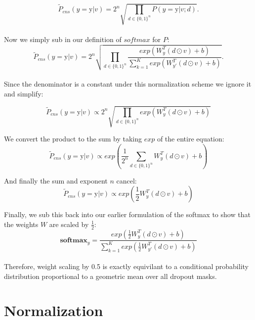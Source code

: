 \documentclass{amsart}
\theoremstyle{definition}
\theoremstyle{remark}
\numberwithin{equation}{section}
\begin{document}
\begin{equation}
\tilde{P}_{ens}(y = \mbox{y} | v) = 2^n \sqrt{ \prod_{d \in \{0, 1\}^n} P(y = \mbox{y} | v;d ) }.
\end{equation} \\

Now we simply sub in our definition of $softmax$ for $P$: \\

\begin{equation}
\tilde{P}_{ens}(y = \mbox{y} | v) = 2^n \sqrt{ \prod_{d \in \{0, 1\}^n}
                \frac{exp \left( W_y^T(d \odot v) + b \right)}
                     {\sum_{k=1}^K exp \left( W_{y'}^T(d \odot v) + b \right)}}.
\end{equation} \\

Since the denominator is a constant under this normalization scheme we ignore it
and simplify:

\begin{equation}
\tilde{P}_{ens}(y = \mbox{y} | v) \propto 2^n \sqrt{ \prod_{d \in \{0, 1\}^n} exp \left( W_y^T(d \odot v) + b \right)}
\end{equation}

We convert the product to the sum by taking $exp$ of the entire equation: \\

\begin{equation}
\tilde{P}_{ens}(y = \mbox{y} | v) \propto exp \left( \frac{1}{2^n} \sum_{d \in \{0, 1\}^n} W_y
^T(d \odot v) + b \right)
\end{equation}

And finally the sum and exponent $n$ cancel: \\

\begin{equation}
\tilde{P}_{ens}(y = \mbox{y} | v) \propto exp \left( \frac{1}{2}  W_y^T(d \odot v) + b \right)
\end{equation}

Finally, we sub this back into our earlier formulation of the softmax to show
that the weights $W$ are scaled by $\frac{1}{2}$: \\

\begin{equation}
\mathbf{softmax}_y = \frac{exp \left( \frac{1}{2}W_y^T(d \odot v) + b \right)}
                          {\sum_{k=1}^K exp \left( \frac{1}{2}W_{y'}^T(d \odot v) + b \right)}
\end{equation} \\

Therefore, weight scaling by 0.5 is exactly equivilant to a conditional
probability distribution proportional to a geometric mean over all dropout masks.

\section{Normalization}
\end{document}
